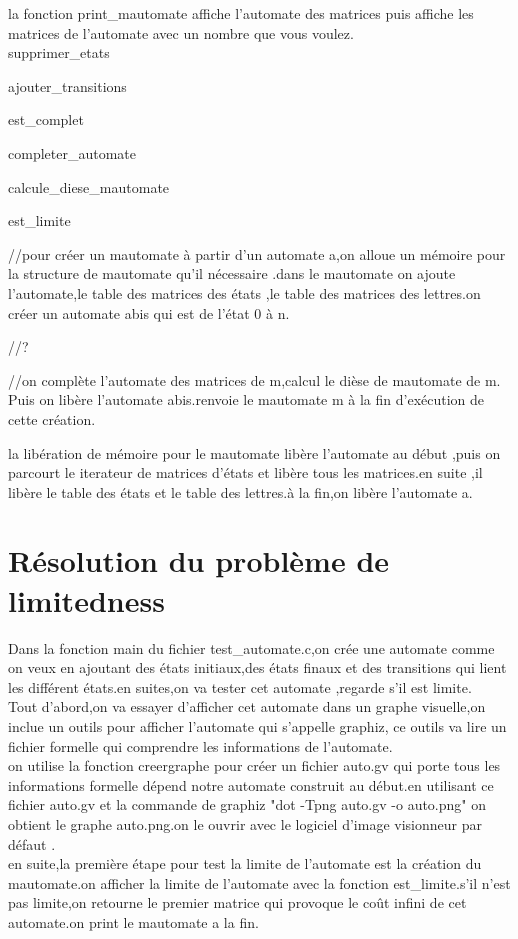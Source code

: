\documentclass{report}
\begin{document}
la fonction print\_mautomate affiche l'automate des matrices puis affiche les matrices de l'automate avec un nombre que vous voulez.\\


supprimer\_etats 

ajouter\_transitions

est\_complet

completer\_automate

calcule\_diese\_mautomate

est\_limite


//pour créer un mautomate à partir d'un automate a,on alloue un mémoire pour la structure de mautomate qu'il nécessaire .dans le mautomate on ajoute l'automate,le table des matrices des états ,le table des matrices des lettres.on créer un automate abis qui est de l'état 0 à n.

//?

//on complète l'automate des matrices de m,calcul le dièse de mautomate de m. Puis on libère l'automate abis.renvoie le mautomate m à la fin d'exécution de cette création.


la libération de mémoire pour le mautomate libère l'automate au début ,puis on parcourt le iterateur de matrices d'états et libère tous les matrices.en suite ,il libère le table des états et le table des lettres.à la fin,on libère l'automate a.\\



\chapter{Résolution du problème de limitedness}

Dans la fonction main du fichier test\_automate.c,on crée une automate comme on veux en ajoutant des états initiaux,des états finaux et des transitions qui lient les différent états.en suites,on va tester cet automate ,regarde s'il est limite.\\

Tout d'abord,on va essayer d'afficher cet automate dans un graphe visuelle,on inclue un outils pour afficher l'automate qui s'appelle  graphiz, ce outils va lire un fichier formelle qui comprendre les informations de l'automate.\\

on utilise la fonction creergraphe pour créer un fichier auto.gv qui porte tous les informations formelle dépend notre automate construit au début.en utilisant ce fichier auto.gv et la commande de graphiz "dot -Tpng auto.gv -o auto.png" on obtient le graphe auto.png.on le ouvrir avec le logiciel  d'image visionneur par défaut .\\

en suite,la première étape pour test la limite de l'automate est la création du mautomate.on afficher la limite de l'automate avec la fonction est\_limite.s'il n'est pas limite,on retourne le premier matrice qui provoque le coût infini de cet automate.on print le mautomate a la fin.\\




\end{document}
